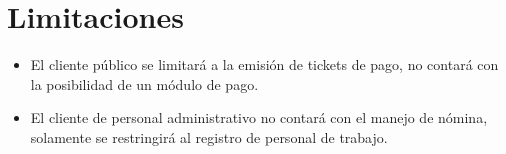 \section{Limitaciones}
\begin{itemize}
\item El cliente público se limitará a la emisión de tickets de pago, no contará con la posibilidad de un módulo de pago.

\item El cliente de personal administrativo no contará con el manejo de nómina, solamente se restringirá al registro de personal de trabajo.
\end{itemize}


